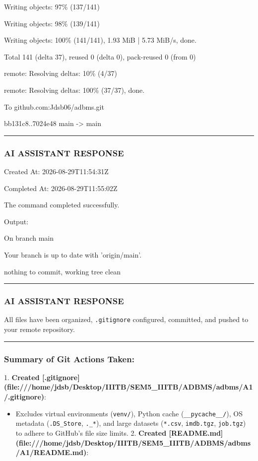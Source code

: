 \documentclass[11pt,a4paper]{article}
\begin{document}
{Writing objects:  97\% (137/141)

Writing objects:  98\% (139/141)

Writing objects: 100\% (141/141), 1.93 MiB | 5.73 MiB/s, done.

Total 141 (delta 37), reused 0 (delta 0), pack-reused 0 (from 0)

remote: Resolving deltas:  10\% (4/37)

remote: Resolving deltas: 100\% (37/37), done.

To github.com:Jdsb06/adbms.git

bb131c8..7024e48  main -> main


\hrule

\subsubsection{AI ASSISTANT RESPONSE}

Created At: 2026-08-29T11:54:31Z

Completed At: 2026-08-29T11:55:02Z


The command completed successfully.

Output:

On branch main

Your branch is up to date with 'origin/main'.


nothing to commit, working tree clean


\hrule

\subsubsection{AI ASSISTANT RESPONSE}

All files have been organized, \texttt{.gitignore} configured, committed, and pushed to your remote repository.


\hrule


\subsubsection{Summary of Git Actions Taken:}
1. \textbf{Created [.gitignore](file:///home/jdsb/Desktop/IIITB/SEM5\_IIITB/ADBMS/adbms/A1/.gitignore)}:

\begin{itemize}
\item Excludes virtual environments (\texttt{venv/}), Python cache (\texttt{\_\_pycache\_\_/}), OS metadata (\texttt{.DS\_Store}, \texttt{.\_*}), and large datasets (\texttt{*.csv}, \texttt{imdb.tgz}, \texttt{job.tgz}) to adhere to GitHub's file size limits.
2. \textbf{Created [README.md](file:///home/jdsb/Desktop/IIITB/SEM5\_IIITB/ADBMS/adbms/A1/README.md)}:


\end{itemize}}
\end{document}
